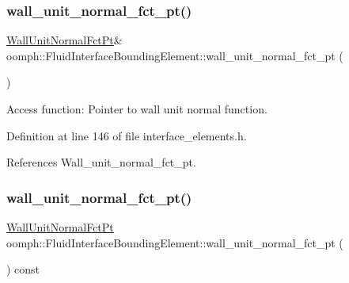 \subsubsection{\texorpdfstring{wall\+\_\+unit\+\_\+normal\+\_\+fct\+\_\+pt()}{wall\_unit\_normal\_fct\_pt()}\hspace{0.1cm}{\footnotesize\ttfamily [1/2]}}
{\footnotesize\ttfamily \hyperlink{classoomph_1_1FluidInterfaceBoundingElement_a09c0b1df7d653eaf55e94e3951d409dd}{Wall\+Unit\+Normal\+Fct\+Pt}\& oomph\+::\+Fluid\+Interface\+Bounding\+Element\+::wall\+\_\+unit\+\_\+normal\+\_\+fct\+\_\+pt (\begin{DoxyParamCaption}{ }\end{DoxyParamCaption})\hspace{0.3cm}{\ttfamily [inline]}}



Access function\+: Pointer to wall unit normal function. 



Definition at line 146 of file interface\+\_\+elements.\+h.



References Wall\+\_\+unit\+\_\+normal\+\_\+fct\+\_\+pt.

\mbox{\label{classoomph_1_1FluidInterfaceBoundingElement_a393601b322d0b8d6d2f86d07bd17550f}} 
\subsubsection{\texorpdfstring{wall\+\_\+unit\+\_\+normal\+\_\+fct\+\_\+pt()}{wall\_unit\_normal\_fct\_pt()}\hspace{0.1cm}{\footnotesize\ttfamily [2/2]}}
{\footnotesize\ttfamily \hyperlink{classoomph_1_1FluidInterfaceBoundingElement_a09c0b1df7d653eaf55e94e3951d409dd}{Wall\+Unit\+Normal\+Fct\+Pt} oomph\+::\+Fluid\+Interface\+Bounding\+Element\+::wall\+\_\+unit\+\_\+normal\+\_\+fct\+\_\+pt (\begin{DoxyParamCaption}{ }\end{DoxyParamCaption}) const\hspace{0.3cm}{\ttfamily [inline]}}



